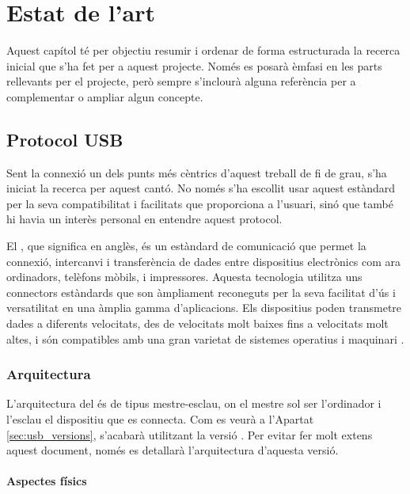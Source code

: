 \chapter{Estat de l'art}
\label{cap:estat-de-l-art}

Aquest capítol té per objectiu resumir i ordenar de forma estructurada la
recerca inicial que s'ha fet per a aquest projecte. Només es posarà èmfasi en
les parts rellevants per el projecte, però sempre s'inclourà alguna referència
per a complementar o ampliar algun concepte.

\section{Protocol USB}

Sent la connexió  un dels punts més cèntrics d'aquest treball de
fi de grau, s'ha iniciat la recerca per aquest cantó. No només s'ha escollit
usar aquest estàndard per la seva compatibilitat
i facilitats que proporciona a l'usuari, sinó que també hi havia un interès
personal en entendre aquest protocol.

El , que significa  en anglès, és un
estàndard de comunicació que permet la connexió, intercanvi i transferència de
dades entre dispositius electrònics com ara ordinadors, telèfons mòbils, i
impressores. Aquesta tecnologia utilitza uns connectors estàndards que son
àmpliament reconeguts per la seva facilitat d'ús i versatilitat en una àmplia
gamma d'aplicacions. Els dispositius  poden transmetre dades a
diferents velocitats, des de velocitats molt baixes fins a velocitats molt
altes, i són compatibles amb una gran varietat de sistemes operatius i
maquinari \cite{Axelson2015USB}.

\subsection{Arquitectura}

L'arquitectura del  és de tipus mestre-esclau, on el mestre sol ser
l'ordinador i l'esclau el dispositiu que es connecta. Com es veurà a l'Apartat
\ref{sec:usb_versions}, s'acabarà utilitzant la versió . Per
evitar fer molt extens aquest document, només es detallarà l'arquitectura
d'aquesta versió.

\subsubsection*{Aspectes físics}
\label{subsub:usb_physic}

